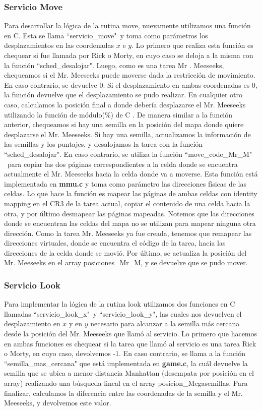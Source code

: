 \documentclass[a4paper]{article}
\begin{document}
\subsubsection{Servicio Move}
\justify
Para desarrollar la lógica de la rutina move, nuevamente utilizamos una función en C. Esta se llama ``servicio_move"\ y toma como parámetros los desplazamientos en las coordenadas $x$ e $y$. Lo primero que realiza esta función es chequear si fue llamada por Rick o Morty, en cuyo caso se deloja a la misma con la función ``sched_desalojar". Luego, como es una tarea Mr . Meeseeks, chequeamos si el Mr. Meeseeks puede moverse dada la restricción de movimiento. En caso contrario, se devuelve 0. Si el desplazamiento en ambas coordenadas es 0, la función devuelve que el desplazamiento se pudo realizar. En cualquier otro caso, calculamos la posición final a donde debería desplazarse el Mr. Meeseeks utilizando la función de módulo(\%) de C . De manera similar a la función anterior, chequeamos si hay una semilla en la posición del mapa donde quiere desplazarse el Mr. Meeseeks. Si hay una semilla, actualizamos la información de las semillas y los puntajes, y desalojamos la tarea con la función ``sched_desalojar". En caso contrario, se utiliza la función ``move_code_Mr_M" \ para copiar las dos páginas correspondientes a la celda donde se encuentra actualmente el Mr. Meeseeks hacia la celda donde va a moverse. Esta función está implementada en \textbf{mmu.c} y toma como parámetro las direcciones físicas de las celdas. Lo que hace la función es mapear las páginas de ambas celdas con identity mapping en el CR3 de la tarea actual, copiar el contenido de una celda hacia la otra, y por último desmapear las páginas mapeadas. Notemos que las direcciones donde se encuentran las celdas del mapa no se utilizan para mapear ninguna otra dirección. Como la tarea Mr. Meeseeks ya fue creada, tenemos que remapear las direcciones virtuales, donde se encuentra el código de la tarea, hacia las direcciones de la celda donde se movió. Por último, se actualiza la posición del Mr. Meeseeks en el array posiciones_Mr_M, y se devuelve que se pudo mover.

\subsubsection{Servicio Look}
\justify
Para implementar la lógica de la rutina look utilizamos dos funciones en C llamadas ``servicio_look_x"\ y ``servicio_look_y", las cuales nos devuelven el desplazamiento en $x$ y en $y$ necesario para alcanzar a la semilla más cercana desde la posición del Mr. Meeseeks que llamó al servicio. Lo primero que hacemos en ambas funciones es chequear si la tarea que llamó al servicio es una tarea Rick o Morty, en cuyo caso, devolvemos -1. En caso contrario, se llama a la función ``semilla_mas_cercana" que está implementada en \textbf{game.c}, la cuál devuelve la semilla que se ubica a menor distancia Manhattan (desempata por posición en el array) realizando una búsqueda lineal en el array posicion_Megasemillas. Para finalizar, calculamos la diferencia entre las coordenadas de la semilla y el Mr. Meeseeks, y devolvemos este valor.
\end{document}
